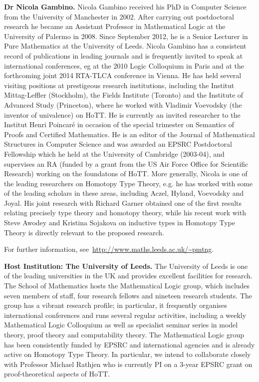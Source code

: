 \documentclass[a4paper,11pt]{article}
\begin{document}
\textbf{Dr Nicola Gambino.} Nicola Gambino received his PhD in
Computer Science from the University of Manchester in 2002. After
carrying out postdoctoral research he became an Assistant Professor in
Mathematical Logic at the University of Palermo in 2008. Since
September 2012, he is a Senior Lecturer in Pure Mathematics at the
University of Leeds. Nicola Gambino has a consistent record of
publications in leading journals and is frequently invited to speak at
international conferences, eg at the 2010 Logic Colloquium in Paris
and at the forthcoming joint 2014 RTA-TLCA conference in Vienna. He
has held several visiting positions at prestigeous research
institutions, including the Institut Mittag-Leffler (Stockholm), the
Fields Institute (Toronto) and the Institute of Advanced Study
(Princeton), where he worked with Vladimir Voevodsky (the inventor of
univalence) on HoTT.  He is currently an invited researcher to the
Institut Henri Poincar\'e in occasion of the special trimester on
Semantics of Proofs and Certified Mathematics.  He is an editor of the
Journal of Mathematical Structures in Computer Science and was awarded
an EPSRC Postdoctoral Fellowship which he held at the University of Cambridge (2003-04), and supervises
an RA (funded by a grant from the US Air Force Office for Scientific
Research) working on the foundatons of HoTT. More generally, Nicola is
one of the leading researchers on Homotopy Type Theory, e.g.  he has
worked with some of the leading scholars in these areas, including
Aczel, Hyland, Voevodsky and Joyal. His joint research with Richard
Garner obtained one of the first results relating precisely type
theory and homotopy theory, while his recent work with Steve Awodey
and Kristina Sojakova on inductive types in Homotopy Type Theory is
directly relevant to the proposed research.

For further information,  see~\url{http://www.maths.leeds.ac.uk/~pmtng}.

\textbf{Host Institution: The University of Leeds.} The University of
Leeds is one of the leading universities in the UK and provides
excellent facilities for research. The School of Mathematics hosts the
Mathematical Logic group, which includes seven members of staff, four
research fellows and nineteen research students. The group has a
vibrant research profile; in particular, it frequently organises
international conferences and runs several regular activities,
including a weekly Mathematical Logic Colloquium as well as specialist
seminar series in model theory, proof theory and computability
theory. The Mathematical Logic group has been consistently funded by
EPSRC and international agencies and is already active on Homotopy
Type Theory. In particular, we intend to collaborate closely with
Professor Michael Rathjen who is currently PI
on a 3-year EPSRC grant on proof-theoretical aspects of HoTT. 
\end{document}
